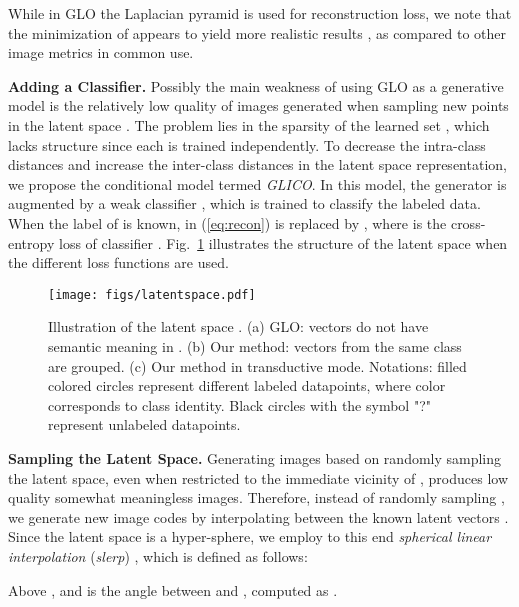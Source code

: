 \documentclass[a4paper,conference]{IEEEtran}
\begin{document}
While in GLO the Laplacian pyramid is used for reconstruction loss, we note that the minimization of  appears to yield more realistic results \cite{glann}, as compared to other image metrics in common use.
		
\textbf{Adding a Classifier.}
Possibly the main weakness of using GLO as a generative model is the relatively low quality of images generated when sampling new points in the latent space . The problem lies in the sparsity of the learned set , which lacks structure since each  is trained independently. To decrease the intra-class distances and increase the inter-class distances in the latent space representation, we propose the conditional model termed \textit{GLICO}. In this model, the generator  is augmented by a weak classifier , which is trained to classify the labeled data. When the label of  is known,  in (\ref{eq:recon}) is replaced by , where  is the cross-entropy loss of classifier . Fig.~\ref{fig:embed} illustrates the structure of the latent space when the different loss functions are used.

\begin{figure}[htbp]
\begin{center}
		\centerline{\texttt{[image: figs/latentspace.pdf]}}
		\caption{Illustration of the latent space . (a) GLO: vectors  do not have semantic meaning in . (b) Our method: vectors from the same class are grouped. (c) Our method in transductive mode. Notations: filled colored circles represent different labeled datapoints, where color corresponds to class identity. Black circles with the symbol "?" represent unlabeled datapoints.}
		\label{fig:embed}
	\end{center}
	\vskip -0.2in
\end{figure}

\textbf{Sampling the Latent Space.} 
Generating images based on randomly sampling the latent space, even when restricted to the immediate vicinity of , produces low quality somewhat meaningless images. Therefore, instead of randomly sampling , we generate new image codes by interpolating between the known latent vectors . Since the latent space  is a hyper-sphere, we employ to this end \textit{spherical linear interpolation} (\emph{slerp}) \cite{Shoemake:1985:ARQ:325165.325242}, which is defined as follows: 

Above , and  is the angle between  and , computed as .
\end{document}
